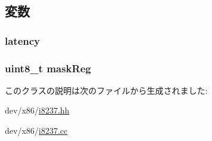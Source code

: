 \subsection{変数}
\hypertarget{classX86ISA_1_1I8237_ac8d8966078cc047949fd1bca8feb21b6}{
\subsubsection[{latency}]{ {\bf latency}}}
\label{classX86ISA_1_1I8237_ac8d8966078cc047949fd1bca8feb21b6}
\hypertarget{classX86ISA_1_1I8237_ae379a70bda13189c6429c4478c0da614}{
\subsubsection[{maskReg}]{\setlength{\rightskip}{0pt plus 5cm}uint8\_\-t {\bf maskReg}}}
\label{classX86ISA_1_1I8237_ae379a70bda13189c6429c4478c0da614}


このクラスの説明は次のファイルから生成されました:\begin{DoxyCompactItemize}
\item 
dev/x86/\hyperlink{i8237_8hh}{i8237.hh}\item 
dev/x86/\hyperlink{i8237_8cc}{i8237.cc}\end{DoxyCompactItemize}
